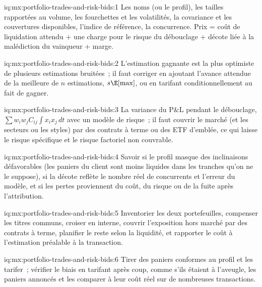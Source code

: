 \begin{solution}{iq:mx:portfolio-trades-and-risk-bids:1}
Les noms (ou le profil), les tailles rapportées au volume, les fourchettes et les volatilités, la covariance et les couvertures disponibles, l'indice de référence, la concurrence. Prix
= coût de liquidation attendu + une charge pour le risque du débouclage + décote liée à la malédiction du vainqueur + marge.
\end{solution}

\begin{solution}{iq:mx:portfolio-trades-and-risk-bids:2}
L'estimation gagnante est la plus optimiste de plusieurs estimations bruitées~; il faut corriger en ajoutant l'avance attendue de la meilleure de $n$ estimations, $s\E[\max]$,
ou en tarifant conditionnellement au fait de gagner.
\end{solution}

\begin{solution}{iq:mx:portfolio-trades-and-risk-bids:3}
La variance du P\&L pendant le débouclage, $\sum w_iw_jC_{ij}\int x_ix_j\,dt$ avec un modèle de risque~; il faut couvrir le marché (et les secteurs ou les styles) par des contrats à terme
ou des ETF d'emblée, ce qui laisse le risque spécifique et le risque factoriel non couvrable.
\end{solution}

\begin{solution}{iq:mx:portfolio-trades-and-risk-bids:4}
Savoir si le profil masque des inclinaisons défavorables (les paniers du client sont moins liquides dans les tranches qu'on ne le suppose), si la décote reflète le nombre réel
de concurrents et l'erreur du modèle, et si les pertes proviennent du coût, du risque ou de la fuite après l'attribution.
\end{solution}

\begin{solution}{iq:mx:portfolio-trades-and-risk-bids:5}
Inventorier les deux portefeuilles, compenser les titres communs, croiser en interne, couvrir l'exposition hors marché par des contrats à terme, planifier le reste selon la liquidité, et
rapporter le coût à l'estimation préalable à la transaction.
\end{solution}

\begin{solution}{iq:mx:portfolio-trades-and-risk-bids:6}
Tirer des paniers conformes au profil et les tarifer~; vérifier le biais en tarifant après coup, comme s'ils étaient à l'aveugle, les paniers annoncés et
les comparer à leur coût réel sur de nombreuses transactions.
\end{solution}
